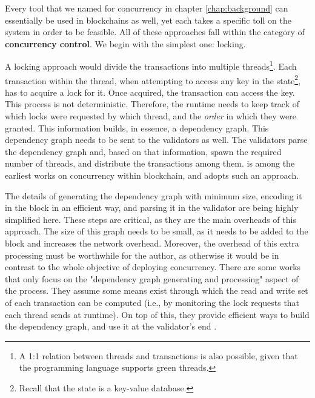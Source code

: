 
Every tool that we named for concurrency in chapter \ref{chap:background} can essentially be used in
blockchains as well, yet each takes a specific toll on the system in order to be feasible. All of
these approaches fall within the category of \textbf{concurrency control}. We begin with the
simplest one: locking.

A locking approach would divide the transactions into multiple threads\footnote{A 1:1 relation
between threads and transactions is also possible, given that the programming language supports
green threads.}. Each transaction within the thread, when attempting to access any key in the
state\footnote{Recall that the state is a key-value database.}, has to acquire a lock for it. Once
acquired, the transaction can access the key. This process is not deterministic. Therefore, the
runtime needs to keep track of which locks were requested by which thread, and the \textit{order} in
which they were granted. This information builds, in essence, a dependency graph. This dependency
graph needs to be sent to the validators as well. The validators parse the dependency graph and,
based on that information, spawn the required number of threads, and distribute the transactions
among them. \cite{dickersonSmartLocksAddingConcurrency2017} is among the earliest works on
concurrency within blockchain, and adopts such an approach.

The details of generating the dependency graph with minimum size, encoding it in the block in an
efficient way, and parsing it in the validator are being highly simplified here. These steps are
critical, as they are the main overheads of this approach. The size of this graph needs to be small,
as it needs to be added to the block and increases the network overhead. Moreover, the overhead of
this extra processing must be worthwhile for the author, as otherwise it would be in contrast to the
whole objective of deploying concurrency. There are some works that only focus on the "dependency
graph generating and processing" aspect of the process. They assume some means exist through which
the read and write set of each transaction can be computed (i.e., by monitoring the lock requests
that each thread sends at runtime). On top of this, they provide efficient ways to build the
dependency graph, and use it at the validator's end \cite{EnablingConcurrencySmart2018}.

